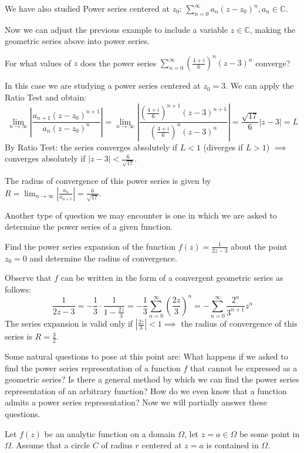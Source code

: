 We have also studied Power series centered at $z_0$: $\sum_{n=0}^{\infty} a_n(z-z_0)^n, a_n \in \mathbb{C}$.

Now we can adjust the previous example to include a variable $z \in \mathbb{C}$, making the geometric series above into power series.

\begin{example}\label{example:15.2} For what values of $z$ does the power series $\sum_{n=0}^{\infty} \left(\frac{4+i}{6}\right)^n (z-3)^n$ converge?
    \begin{soln}
         In this case we are studying a power series centered at $z_0 = 3$. We can apply the Ratio Test and obtain:
        \[  \lim_{n \to \infty} \left| \frac{a_{n+1}(z-z_0)^{n+1}}{a_n(z-z_0)^n} \right| = \lim_{n \to \infty} \left| \frac{(\frac{4+i}{6})^{n+1}(z-3)^{n+1}}{(\frac{4+i}{6})^n (z-3)^n} \right| = \frac{\sqrt{17}}{6}|z-3| = L \]
        By Ratio Test: the series converges absolutely if $L < 1$ (diverges if $L > 1$) $\implies$ converges absolutely if $|z-3| < \frac{6}{\sqrt{17}}$.
        
        The radius of convergence of this power series is given by $R = \lim_{n \to \infty} \left| \frac{a_n}{a_{n+1}} \right| = \frac{6}{\sqrt{17}}$.
    \end{soln}
\end{example}

Another type of question we may encounter is one in which we are asked to determine the power series of a given function.

\begin{example}\label{example:15.3} 
    Find the power series expansion of the function $f(z) = \frac{1}{2z-3}$ about the point $z_0 = 0$ and determine the radius of convergence.
\begin{soln}
        Observe that $f$ can be written in the form of a convergent geometric series as follows:
    \[ \frac{1}{2z-3} = -\frac{1}{3} \cdot \frac{1}{1 - \frac{2z}{3}} = -\frac{1}{3} \sum_{n=0}^{\infty} \left(\frac{2z}{3}\right)^n = -\sum_{n=0}^{\infty} \frac{2^n}{3^{n+1}}z^n \]
    The series expansion is valid only if $\left|\frac{2z}{3}\right| < 1 \implies$ the radius of convergence of this series is $R = \frac{3}{2}$.
\end{soln}
\end{example}

Some natural questions to pose at this point are: What happens if we asked to find the power series representation of a function $f$ that cannot be expressed as a geometric series? Is there a general method by which we can find the power series representation of an arbitrary function? How do we even know that a function admits a power series representation? Now we will partially answer these questions.
\begin{theorem}\label{theorem:13.1}
    Let $f(z)$ be an analytic function on a domain $\Omega$, let $z = a \in \Omega$ be some point in $\Omega$. Assume that a circle $C$ of radius $r$ centered at $z = a$ is contained in $\Omega$.
\end{theorem}

